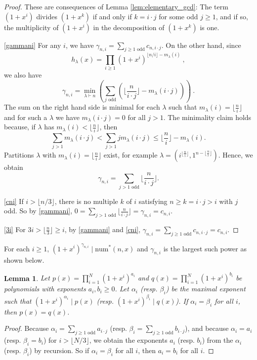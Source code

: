 \documentclass[reqno]{amsart}
\def\e{\gamma}
\def\num{\mathrm{num}}
\newtheorem{lemma}[theorem]{Lemma}
\theoremstyle{definition}
\begin{document}
\begin{proof}[Proof] These are consequences of Lemma \ref{lem:elementary_gcd}:  The term $(1+x^i)$ divides $(1+x^k)$ if and only if $k=i\cdot j$ for some odd $j\geq 1$, and if so, the multiplicity of $(1+x^i)$  in the decomposition of $(1+x^k)$ is one.

\ref{gammani} For any $i$, we have $\e_{n,i}=\sum_{j \geq 1 \textrm{ odd}}c_{n,i\cdot j}$. 
On the other hand, since
\[h_\lambda(x)=\prod_{i\geq 1}(1+x^i)^{\lfloor n/i\rfloor-m_\lambda(i)}\:,\]
 we also have
    \[\e_{n,i}=\min_{\lambda\vdash n}\left(\sum_{j \textrm{ odd}}(\lfloor\frac{n}{i\cdot j}\rfloor-m_\lambda(i\cdot j))\right)\:.\] 
    The sum on the right hand side is minimal for each $\lambda$ such that $m_\lambda(i)=\lfloor\frac{n}{i}\rfloor$ and  for such a $\lambda$ we have $m_\lambda(i\cdot j)=0$ for all $j>1$. The minimality claim holds because, if $\lambda$ has $m_\lambda(i)<\lfloor\frac{n}{i}\rfloor$, then    
      \begin{equation*} \label{ineq:mult}
        \sum_{j>1}m_\lambda(i\cdot j)< \sum_{j>1}jm_\lambda(i\cdot j)\leq \lfloor\frac{n}{i}\rfloor-m_\lambda(i).    \end{equation*}
     Partitions $\lambda$ with $m_\lambda(i)=\lfloor\frac{n}{i}\rfloor$ exist, for  example  $\lambda=(i^{\lfloor\frac{n}{i}\rfloor},1^{n-\lfloor\frac{n}{i}\rfloor})$.
Hence, we obtain     
    \[\e_{n,i}=\sum_{j>1 \textrm{ odd}}\lfloor\frac{n}{i\cdot j}\rfloor.\]

\ref{cni}
 If $i>\lfloor n/3\rfloor$, there is no multiple $k$ of $i$ satisfying $n\geq k=i\cdot j>i$ with $j$ odd. 
 So by \ref{gammani}, $0=\sum_{j>1 \textrm{ odd} }\lfloor\frac{n}{i\cdot j}\rfloor=\e_{n,i}=c_{n,i}$.

\ref{3i} For $3i>\lfloor \frac{n}{3}\rfloor\geq i $, by \ref{gammani} and \ref{cni}, 
$\e_{n,i}=\sum_{j \geq 1 \textrm{ odd}}c_{n,i\cdot j}=c_{n,i}$. 
\end{proof}



For each $i\geq 1$,  $(1+x^i)^{\e_{n,i}}\mid \num^*(n,x)$ and $\e_{n,i}$ is the largest such power as shown below. 





\begin{lemma}\label{lemma:on_exponents}
    Let $p(x)=\prod_{i=1}^N(1+x^i)^{a_i}$ and $q(x)=\prod_{i=1}^N(1+x^i)^{b_i}$ be polynomials with exponents $a_i,b_i\geq 0$. Let $\alpha_i$ (resp. $\beta_i$) be the maximal exponent such that $(1+x^i)^{\alpha_i}\mid p(x)$ (resp. $(1+x^i)^{\beta_i}\mid q(x)$). If $\alpha_i=\beta_i$ for all $i$, then $p(x)=q(x)$.
\end{lemma}
\begin{proof}
    Because $\alpha_i=\sum_{j\geq 1 \textrm{ odd}} a_{i\cdot j}$ (resp. $\beta_i=\sum_{j\geq 1 \textrm{ odd}} b_{i\cdot j}$), and because $\alpha_i=a_i$ (resp. $\beta_i=b_i$) for $i> \lfloor N/3\rfloor$, we obtain the exponents $a_i$ (resp. $b_i$) from the $\alpha_i$ (resp. $\beta_i$) by recursion. So if $\alpha_i=\beta_i$ for all $i$, then $a_i=b_i$ for all $i$.
\end{proof}
\end{document}
